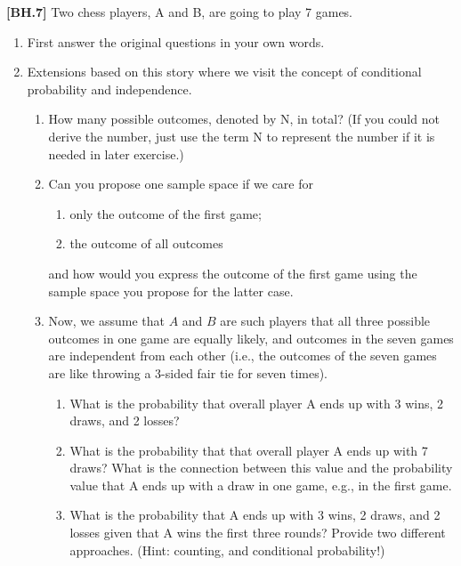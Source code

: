 \begin{exercise}\textbf{[BH.7]}
	Two chess players, A and B, are going to play 7 games. 
		\begin{enumerate}
		\item First answer the original questions in your own words.
		\item Extensions based on this story where we visit the concept of conditional probability and independence.
		\begin{enumerate}
					\item How many possible outcomes, denoted by N, in total? (If you could not derive the number, just use the term N to represent the number if it is needed in later exercise.)
			\item Can you propose one sample space if we care for 
			\begin{enumerate}
				\item only the outcome of the first game;
				\item the outcome of all outcomes
			\end{enumerate}
			and how would you express the outcome of the first game using the sample space you propose for the latter case.
			\item Now, we assume that $A$ and $B$ are such players that all three possible outcomes in one game are equally likely, and outcomes in the seven games are independent from each other (i.e., the outcomes of the seven games are like throwing a 3-sided fair tie for seven times). 
			\begin{enumerate}
				\item What is the probability that overall player A ends up with 3 wins, 2 draws, and 2 losses?
				\item What is the probability that that overall player A ends up with 7 draws? What is the connection between this value and the probability value that A ends up with a draw in one game, e.g., in the first game.
				\item What is the probability that A ends up with 3 wins, 2 draws, and 2 losses given that A wins the first three rounds? Provide two different approaches. (Hint: counting, and conditional probability!) 
			\end{enumerate}
		\end{enumerate}
		\end{enumerate}
\end{exercise}
